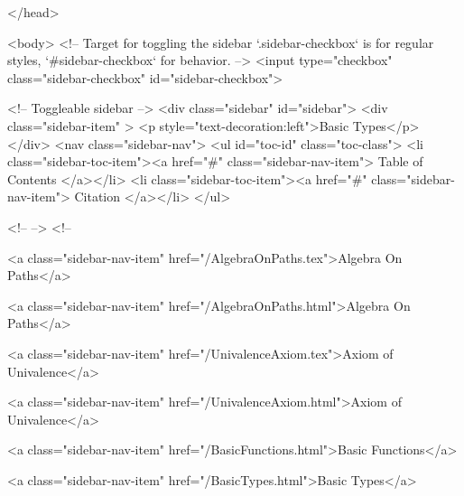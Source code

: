   
</head>




  <body>
    <!-- Target for toggling the sidebar `.sidebar-checkbox` is for regular
     styles, `#sidebar-checkbox` for behavior. -->
<input type="checkbox" class="sidebar-checkbox" id="sidebar-checkbox">

<!-- Toggleable sidebar -->
<div class="sidebar" id="sidebar">
  <div class="sidebar-item" >
    <p style="text-decoration:left">Basic Types</p>
  </div>
  <nav class="sidebar-nav">
    <ul id="toc-id" class="toc-class">
  <li class="sidebar-toc-item"><a href="#" class="sidebar-nav-item"> Table of Contents </a></li>
  <li class="sidebar-toc-item"><a href="#" class="sidebar-nav-item"> Citation </a></li>
</ul>


    <!--  -->
    <!-- 
      
    
      
    
      
    
      
        
      
    
      
        
          <a class="sidebar-nav-item" href="/AlgebraOnPaths.tex">Algebra On Paths</a>
        
      
    
      
        
          <a class="sidebar-nav-item" href="/AlgebraOnPaths.html">Algebra On Paths</a>
        
      
    
      
        
          <a class="sidebar-nav-item" href="/UnivalenceAxiom.tex">Axiom of Univalence</a>
        
      
    
      
        
          <a class="sidebar-nav-item" href="/UnivalenceAxiom.html">Axiom of Univalence</a>
        
      
    
      
        
          <a class="sidebar-nav-item" href="/BasicFunctions.html">Basic Functions</a>
        
      
    
      
        
          <a class="sidebar-nav-item" href="/BasicTypes.html">Basic Types</a>
        
      
    
      
        
